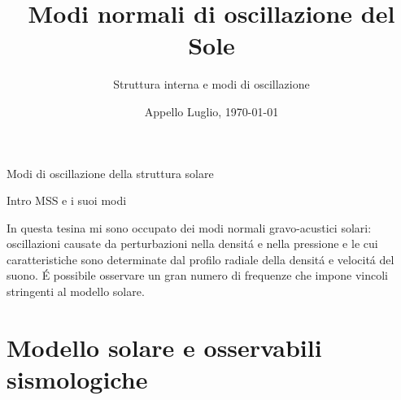 \documentclass[10pt,xcolor={usenames},fleqn,mathserif,serif]{beamer}
\title{Modi normali di oscillazione del Sole}
\subtitle{Struttura interna e modi di oscillazione}
\date{Appello Luglio, \today}
\begin{document}


\begin{frame}
  \titlepage
\end{frame}


\begin{frame}[label={intro}]{Modi di oscillazione della struttura solare}

\end{frame}

\begin{wordonframe}{Intro MSS e i suoi modi}

In questa tesina mi sono occupato dei modi normali gravo-acustici solari: oscillazioni causate da perturbazioni nella densit\'a e nella pressione e le cui caratteristiche sono determinate dal profilo radiale della densit\'a e velocit\'a del suono. \'E possibile osservare un gran numero di frequenze che impone vincoli stringenti al modello solare.

\end{wordonframe}



\part{Modello solare e osservabili sismologiche}\label{part:MSS}
\frame{\partpage}



\end{document}
